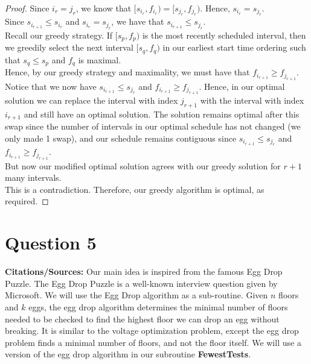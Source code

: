 \documentclass[12pt]{article}
\begin{document}
\begin{proof}
Since $i_r = j_r$, we know that $[s_{i_r}, f_{i_r}) = [s_{j_r}, f_{j_r})$. Hence, $s_{i_r} = s_{j_r}$. \\

Since $s_{i_{r+1}} \leq s_{i_r}$ and $s_{i_r} = s_{j_r}$, we have that $s_{i_{r+1}} \leq  s_{j_r}$. \\

Recall our greedy strategy. If $[s_p, f_p)$ is the most recently scheduled interval, then we greedily select the next interval $[s_q, f_q)$ in our earliest start time ordering such that $s_q \leq s_p$ and $f_q$ is maximal. \\

Hence, by our greedy strategy and maximality, we must have that $f_{i_{r+1}} \geq f_{j_{r+1}}$. \\

Notice that we now have $s_{i_{r+1}} \leq  s_{j_r}$ and $f_{i_{r+1}} \geq f_{j_{r+1}}$. Hence, in our optimal solution we can replace the interval with index $j_{r+1}$ with the interval with index $i_{r+1}$ and still have an optimal solution. The solution remains optimal after this swap since the number of intervals in our optimal schedule has not changed (we only made 1 swap), and our schedule remains contiguous since $s_{i_{r+1}} \leq  s_{j_r}$ and $f_{i_{r+1}} \geq f_{j_{r+1}}$. \\

But now our modified optimal solution agrees with our greedy solution for $r+1$ many intervals. \\

This is a contradiction. Therefore, our greedy algorithm is optimal, as required. 
\end{proof}

\newpage

\section*{Question 5}

\textbf{Citations/Sources:} Our main idea is inspired from the famous Egg Drop Puzzle. The Egg Drop Puzzle is a well-known interview question given by Microsoft. We will use the Egg Drop algorithm as a sub-routine. Given $n$ floors and $k$ eggs, the egg drop algorithm determines the minimal number of floors needed to be checked to find the highest floor we can drop an egg without breaking. It is similar to the voltage optimization problem, except the egg drop problem finds a minimal number of floors, and not the floor itself. We will use a version of the egg drop algorithm in our subroutine \textbf{FewestTests}. \\
\end{document}
